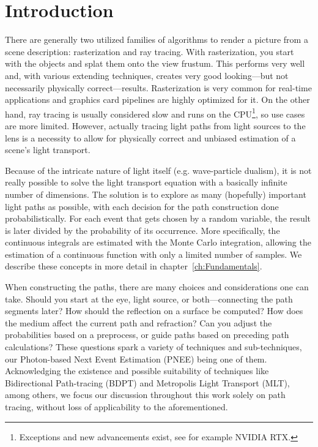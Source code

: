 \chapter{Introduction}
\label{ch:Introduction}

There are generally two utilized families of algorithms to render a picture from a scene description: rasterization and ray tracing. With rasterization, you start with the objects and splat them onto the view frustum. This performs very well and, with various extending techniques, creates very good looking---but not necessarily physically correct---results.  Rasterization is very common for real-time applications and graphics card pipelines are highly optimized for it. On the other hand, ray tracing is usually considered slow and runs on the CPU\footnote{Exceptions and new advancements exist, see for example NVIDIA RTX.}, so use cases are more limited. However, actually tracing light paths from light sources to the lens is a necessity to allow for physically correct and unbiased estimation of a scene's light transport.

Because of the intricate nature of light itself (e.g. wave-particle dualism), it is not really possible to solve the light transport equation with a basically infinite number of dimensions. The solution is to explore as many (hopefully) important light paths as possible, with each decision for the path construction done probabilistically. For each event that gets chosen by a random variable, the result is later divided by the probability of its occurrence. More specifically, the continuous integrals are estimated with the Monte Carlo integration, allowing the estimation of a continuous function with only a limited number of samples. We describe these concepts in more detail in chapter~\ref{ch:Fundamentals}.

When constructing the paths, there are many choices and considerations one can take. Should you start at the eye, light source, or both---connecting the path segments later? How should the reflection on a surface be computed? How does the medium affect the current path and refraction? Can you adjust the probabilities based on a preprocess, or guide paths based on preceding path calculations?
These questions spark a variety of techniques and sub-techniques, our Photon-based Next Event Estimation (PNEE) being one of them. Acknowledging the existence and possible suitability of techniques like Bidirectional Path-tracing (BDPT) and Metropolis Light Transport (MLT), among others, we focus our discussion throughout this work solely on path tracing, without loss of applicability to the aforementioned.

